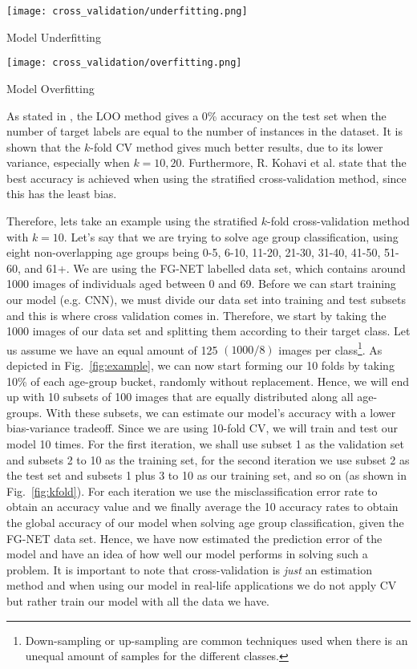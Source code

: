 \begin{marginfigure}%
	\centering
	\texttt{[image: cross\_validation/underfitting.png]}
	\caption{Model Underfitting}
\end{marginfigure}
\begin{marginfigure}%
	\centering	
	\texttt{[image: cross\_validation/overfitting.png]}
	\caption{Model Overfitting}
	\label{fig:models}
\end{marginfigure}

As stated in \citep{kohavi1995study}, the LOO method gives a 0\% accuracy on the test set when the number of target labels are equal to the number of instances in the dataset. It is shown that the $k$-fold CV method gives much better results, due to its lower variance, especially when $k = {10, 20}$. Furthermore, R. Kohavi et al. state that the best accuracy is achieved when using the stratified cross-validation method, since this has the least bias.

Therefore, lets take an example using the stratified $k$-fold cross-validation method with $k=10$. Let's say that we are trying to solve age group classification, using eight non-overlapping age groups being 0-5, 6-10, 11-20, 21-30, 31-40, 41-50, 51-60, and 61+. We are using the FG-NET labelled data set, which contains around 1000 images of individuals aged between 0 and 69. Before we can start training our model (e.g. CNN), we must divide our data set into training and test subsets and this is where cross validation comes in. Therefore, we start by taking the 1000 images of our data set and splitting them according to their target class. Let us assume we have an equal amount of 125 $(1000/8)$ images per class\footnote{Down-sampling or up-sampling are common techniques used when there is an unequal amount of samples for the different classes.}. As depicted in Fig.~\ref{fig:example}, we can now start forming our 10 folds by taking 10\% of each age-group bucket, randomly without replacement. Hence, we will end up with 10 subsets of 100 images that are equally distributed along all age-groups. With these subsets, we can estimate our model's accuracy with a lower bias-variance tradeoff. Since we are using 10-fold CV, we will train and test our model 10 times. For the first iteration, we shall use subset 1 as the validation set and subsets 2 to 10 as the training set, for the second iteration we use subset 2 as the test set and subsets 1 plus 3 to 10 as our training set, and so on (as shown in Fig.~\ref{fig:kfold}). For each iteration we use the misclassification error rate to obtain an accuracy value and we finally average the 10 accuracy rates to obtain the global accuracy of our model when solving age group classification, given the FG-NET data set. Hence, we have now estimated the prediction error of the model and have an idea of how well our model performs in solving such a problem. It is important to note that cross-validation is \textit{just} an estimation method and when using our model in real-life applications we do not apply CV but rather train our model with all the data we have.

